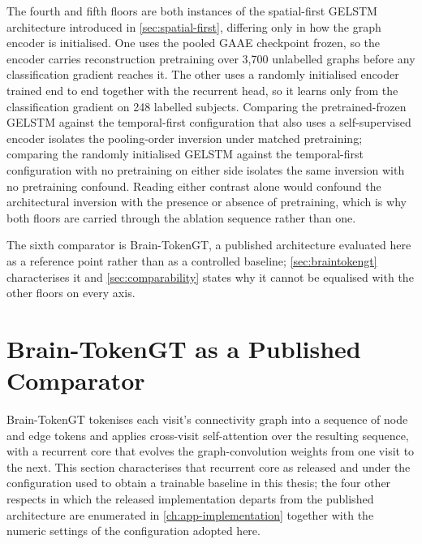 The fourth and fifth floors are both instances of the spatial-first \ac{GELSTM}
architecture introduced in \autoref{sec:spatial-first}, differing only in how the graph
encoder is initialised. One uses the pooled \ac{GAAE} checkpoint frozen, so the encoder
carries reconstruction pretraining over 3{,}700 unlabelled graphs before any classification
gradient reaches it. The other uses a randomly initialised encoder trained end to end
together with the recurrent head, so it learns only from the classification gradient on
248 labelled subjects. Comparing the pretrained-frozen \ac{GELSTM} against the
temporal-first configuration that also uses a self-supervised encoder isolates the pooling-order
inversion under matched pretraining; comparing the randomly initialised \ac{GELSTM} against
the temporal-first configuration with no pretraining on either side isolates the same inversion with
no pretraining confound. Reading either contrast alone would confound the architectural
inversion with the presence or absence of pretraining, which is why both floors are
carried through the ablation sequence rather than one.

The sixth comparator is Brain-TokenGT, a published architecture evaluated here as a
reference point rather than as a controlled baseline; \autoref{sec:braintokengt}
characterises it and \autoref{sec:comparability} states why it cannot be equalised with the
other floors on every axis.

\section{Brain-TokenGT as a Published Comparator}\label{sec:braintokengt}

Brain-TokenGT \parencite{dong2023braintokengt} tokenises each visit's connectivity graph
into a sequence of node and edge tokens and applies cross-visit self-attention over the
resulting sequence, with a recurrent core that evolves the graph-convolution weights from
one visit to the next. This section characterises that recurrent core as released and under
the configuration used to obtain a trainable baseline in this thesis; the four other
respects in which the released implementation departs from the published architecture are
enumerated in \autoref{ch:app-implementation} together with the numeric settings of the
configuration adopted here.

